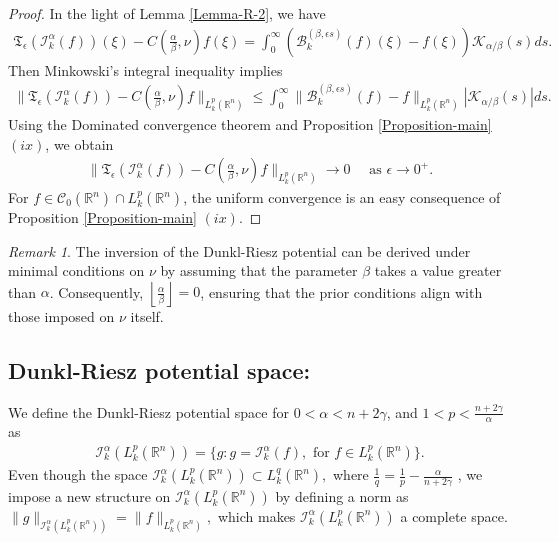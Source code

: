 \documentclass[11pt,a4paper,reqno]{amsproc}
\theoremstyle{definition}
\theoremstyle{remark}
\newtheorem{remark}[theorem]{Remark}
\numberwithin{equation}{section}
\begin{document}
\begin{proof}
In the light of Lemma \ref{Lemma-R-2}, we have 
\begin{align*}
    \mathfrak{T}_\epsilon\left(\mathcal{I}_k^\alpha (f)\right)(\xi)-C\left(\frac{\alpha}{\beta},\nu\right)f(\xi) = \int_0^\infty \left(
    \mathcal{B}_k^{(\beta, \epsilon s)}(f)(\xi) - f(\xi)
    \right)\mathcal{K}_{\alpha/\beta}(s) ds.
\end{align*}Then Minkowski's integral inequality implies 
\begin{align*}
    \|  \mathfrak{T}_\epsilon(\mathcal{I}_k^\alpha(f))-C\left(\frac{\alpha}{\beta},\nu\right) f\|_{L_k^p(\mathbb{R}^n)} \leq \int_0^\infty 
    \|
    \mathcal{B}_k^{(\beta, \epsilon s)}(f) - f
    \|_{L_k^p(\mathbb{R}^n)} |\mathcal{K}_{\alpha/\beta}(s)| ds.
\end{align*}
Using the Dominated convergence theorem and Proposition \ref{Proposition-main} $(ix)$, we obtain
\begin{align*}
    \|  \mathfrak{T}_\epsilon(\mathcal{I}_k^\alpha (f))-C\left(\frac{\alpha}{\beta},\nu\right)f\|_{L_k^p(\mathbb{R}^n)} \longrightarrow 0 \quad \text{ as } \epsilon \longrightarrow 0^+. 
\end{align*} For $f\in \mathcal{C}_0(\mathbb{R}^n)\cap L_k^p(\mathbb{R}^n)$, the uniform convergence is an easy consequence of Proposition \ref{Proposition-main} $(ix)$.   
\end{proof}
\begin{remark}
    The inversion of the Dunkl-Riesz potential can be derived under minimal conditions on $\nu$ by assuming that the parameter $\beta$ takes a value greater than $\alpha$. Consequently, $\left\lfloor \frac{\alpha}{\beta} \right\rfloor = 0$, ensuring that the prior conditions align with those imposed on $\nu$ itself.
\end{remark}


\subsection{Dunkl-Riesz potential space:} We define the Dunkl-Riesz potential space for $0<\alpha< n+2\gamma$, and $1<p < \frac{n+2\gamma}{\alpha}$  as 
 \begin{align*}
     \mathcal{I}_k^\alpha(L_k^p(\mathbb{R}^n))=\{g : g = \mathcal{I}_k^\alpha(f), \text{ for } f\in L_k^p(\mathbb{R}^n) \} .
 \end{align*} 
Even though the space $\mathcal{I}_k^\alpha\left(L_k^p(\mathbb{R}^n)\right) \subset L_k^q(\mathbb{R}^n),$ where $\frac{1}{q}=\frac{1}{p}-\frac{\alpha}{n+2\gamma}$ \cite{Hassani}, we impose a new structure on  $\mathcal{I}_k^\alpha(L_k^p(\mathbb{R}^n))$  by defining a norm as $\|g\|_{\mathcal{I}_k^\alpha(L_k^p(\mathbb{R}^n))}= \|f\|_{L_k^p(\mathbb{R}^n)},$ which makes  $\mathcal{I}_k^\alpha(L_k^p(\mathbb{R}^n))$ a complete space.\\
\end{document}

